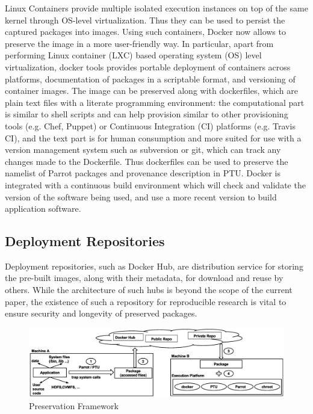 \vspace{5pt}
 Linux Containers provide multiple isolated execution instances on top of the same kernel through OS-level virtualization. Thus they can be used to persist the captured packages into images. Using such containers, Docker now allows to preserve the image in a more user-friendly way. In particular, apart from performing Linux container (LXC) based operating system (OS) level virtualization, docker tools provides portable deployment of containers across platforms, documentation of packages in a scriptable format, and versioning of container images. The image can be preserved along with dockerfiles, which are plain text files with a literate programming environment: the computational part is similar to shell scripts and can help provision similar to other provisioning tools (e.g. Chef, Puppet) or Continuous Integration (CI) platforms (e.g. Travis CI), and the text part is for human consumption and more suited for use with a version management system such as subversion or git, which can track any changes made to the Dockerfile. Thus dockerfiles can be used to preserve the namelist of Parrot packages and provenance description in PTU. 
Docker is integrated with a continuous build environment which will check and validate the version of the software being used, and use a more recent version to build application software. 


\subsection{Deployment  Repositories}
Deployment repositories, such as Docker Hub, are distribution service for storing the pre-built images, along with their metadata, for download and reuse by others. While the architecture of such hubs is beyond the scope of the current paper, the existence of such a repository for reproducible research is vital to ensure security and longevity of preserved packages. 



\begin{figure}
\centering
\includegraphics[width=.8\textwidth]{preservation_framework.eps}
\caption{Preservation Framework}
\label{fig: preservation_framework}
\end{figure}

